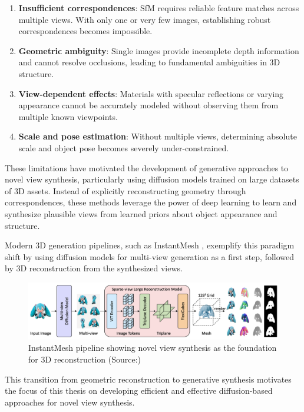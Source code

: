 \begin{enumerate}
  \item \textbf{Insufficient correspondences}: SfM requires reliable feature matches across multiple views. With only one or very few images, establishing robust correspondences becomes impossible.

  \item \textbf{Geometric ambiguity}: Single images provide incomplete depth information and cannot resolve occlusions, leading to fundamental ambiguities in 3D structure.

  \item \textbf{View-dependent effects}: Materials with specular reflections or varying appearance cannot be accurately modeled without observing them from multiple known viewpoints.

  \item \textbf{Scale and pose estimation}: Without multiple views, determining absolute scale and object pose becomes severely under-constrained.
\end{enumerate}

These limitations have motivated the development of generative approaches to novel view synthesis, particularly using diffusion models trained on large datasets of 3D assets. Instead of explicitly reconstructing geometry through correspondences, these methods leverage the power of deep learning to learn and synthesize plausible views from learned priors about object appearance and structure.

Modern 3D generation pipelines, such as InstantMesh \cite{instantmesh}, exemplify this paradigm shift by using diffusion models for multi-view generation as a first step, followed by 3D reconstruction from the synthesized views.

\begin{figure}[h]
  \centering
  \includegraphics[width=\textwidth]{images/related-work/instantmesh.png}
  \caption{InstantMesh pipeline showing novel view synthesis as the foundation for 3D reconstruction (Source:\cite{instantmesh})}
  \label{fig:instantmesh}
\end{figure}

This transition from geometric reconstruction to generative synthesis motivates the focus of this thesis on developing efficient and effective diffusion-based approaches for novel view synthesis.

